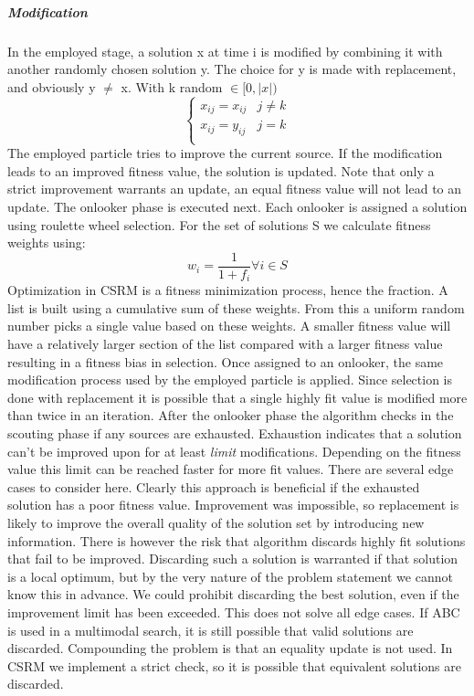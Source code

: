 \subparagraph{Modification}
In the employed stage, a solution x at time i is modified by combining it with another randomly chosen solution y. The choice for y is made with replacement, and obviously y $\neq$ x.
With k random $\in [0, \vert x \vert)$
\[   \left\{
\begin{array}{ll}
      x_{ij} = x_{ij} & j \neq k \\
      x_{ij} = y_{ij} & j = k \\
\end{array} 
\right.
\]
The employed particle tries to improve the current source. If the modification leads to an improved fitness value, the solution is updated. Note that only a strict improvement warrants an update, an equal fitness value will not lead to an update. 
The onlooker phase is executed next. Each onlooker is assigned a solution using roulette wheel selection.
For the set of solutions S we calculate fitness weights using:
\[
w_i = \frac{1}{1 + f_i} \forall i \in S 
\]
Optimization in CSRM is a fitness minimization process, hence the fraction. A list is built using a cumulative sum of these weights. From this a uniform random number picks a single value based on these weights. A smaller fitness value will have a relatively larger section of the list compared with a larger fitness value resulting in a fitness bias in selection. 
Once assigned to an onlooker, the same modification process used by the employed particle is applied. Since selection is done with replacement it is possible that a single highly fit value is modified more than twice in an iteration. 
After the onlooker phase the algorithm checks in the scouting phase if any sources are exhausted. Exhaustion indicates that a solution can't be improved upon for at least \textit{limit} modifications. Depending on the fitness value this limit can be reached faster for more fit values. There are several edge cases to consider here. Clearly this approach is beneficial if the exhausted solution has a poor fitness value. Improvement was impossible, so replacement is likely to improve the overall quality of the solution set by introducing new information. There is however the risk that algorithm discards highly fit solutions that fail to be improved. Discarding such a solution is warranted if that solution is a local optimum, but by the very nature of the problem statement we cannot know this in advance. We could prohibit discarding the best solution, even if the improvement limit has been exceeded. This does not solve all edge cases. If ABC is used in a multimodal search, it is still possible that valid solutions are discarded. Compounding the problem is that an equality update is not used. In CSRM we implement a strict check, so it is possible that equivalent solutions are discarded. 
